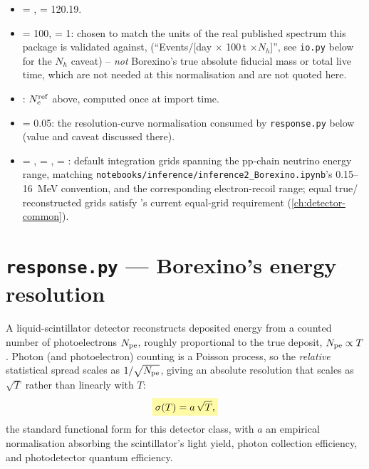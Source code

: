 \begin{implbox}
\begin{itemize}
  \item {} = ,
     = 120.19.
  \item {} = 100,  = 1:
    chosen to match the units of the real published spectrum this package is
    validated against,
    (``Events/[day $\times$ 100\,t $\times N_h$]'', see \texttt{io.py} below
    for the $N_h$ caveat) -- \emph{not} Borexino's true absolute fiducial
    mass or total live time, which are not needed at this normalisation and
    are not quoted here.
  \item {}: $N_e^{\rm ref}$ above, computed once
    at import time.
  \item {} = 0.05: the resolution-curve
    normalisation consumed by \texttt{response.py} below (value and caveat
    discussed there).
  \item {} = ,
     = ,
     = : default integration
    grids spanning the pp-chain neutrino energy range, matching
    \texttt{notebooks/inference/inference2\_Borexino.ipynb}'s 0.15--16~MeV
    convention, and the corresponding electron-recoil range; equal true/
    reconstructed grids satisfy 's current
    equal-grid requirement (\cref{ch:detector-common}).
\end{itemize}
\end{implbox}

\section{\texttt{response.py} --- Borexino's energy resolution}


\begin{theorybox}
A liquid-scintillator detector reconstructs deposited energy from a counted
number of photoelectrons $N_{\rm pe}$, roughly proportional to the true
deposit, $N_{\rm pe}\propto T$. Photon (and photoelectron) counting is a
Poisson process, so the \emph{relative} statistical spread scales as
$1/\sqrt{N_{\rm pe}}$, giving an absolute resolution that scales as
$\sqrt{T}$ rather than linearly with $T$:
\begin{equation}
  \keyresult{\sigma(T) = a\,\sqrt{T},}
  \label{eq:borexino-sigma}
\end{equation}
the standard functional form for this detector class, with $a$ an
empirical normalisation absorbing the scintillator's light yield, photon
collection efficiency, and photodetector quantum efficiency.
\end{theorybox}


